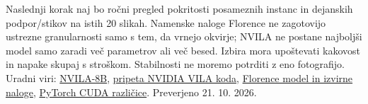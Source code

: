 Naslednji korak naj bo ročni pregled pokritosti posameznih instanc in dejanskih podpor/stikov na istih 20 slikah. Namenske naloge Florence ne zagotovijo ustrezne granularnosti samo s tem, da vrnejo okvirje; NVILA ne postane najboljši model samo zaradi več parametrov ali več besed. Izbira mora upoštevati kakovost in napake skupaj s stroškom. Stabilnosti ne moremo potrditi z eno fotografijo.
\vfill{\footnotesize Uradni viri: \href{https://huggingface.co/Efficient-Large-Model/NVILA-8B}{NVILA-8B}, \href{https://github.com/NVlabs/VILA/tree/57ecbfb904b99b563db69ef7916f6390eecea516}{pripeta NVIDIA VILA koda}, \href{https://huggingface.co/microsoft/Florence-2-large}{Florence model in izvirne naloge}, \href{https://pytorch.org/get-started/previous-versions/}{PyTorch CUDA različice}. Preverjeno 21. 10. 2026.}
